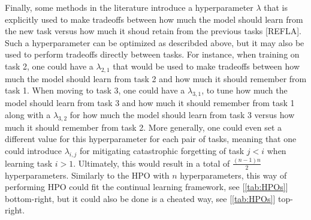 \documentclass[11pt]{article}
\begin{document}
\vspace{2mm}
\noindent
Finally, some methods in the literature introduce a hyperparameter $\lambda$ that is explicitly used to make tradeoffs between how much the model should learn from the new task versus how much it shoud retain from the previous tasks [REFLA]. Such a hyperparameter can be optimized as describded above, but it may also be used to perform tradeoffs directly between tasks. For instance, when training on task 2, one could have a $\lambda_{2,1}$ that would be used to make tradeoffs between how much the model should learn from task 2 and how much it should remember from task 1. When moving to task 3, one could have a $\lambda_{3,1}$, to tune how much the model should learn from task 3 and how much it should remember from task 1 along with a $\lambda_{3,2}$ for how much the model should learn from task 3 versus how much it should remember from task 2. More generally, one could even set a different value for this hyperparameter for each pair of tasks, meaning that one could introduce $\lambda_{i,j}$ for mitigating catastrophic forgetting of task $j<i$ when learning task $i>1$. Ultimately, this would result in a total of $\frac{(n-1)n}{2}$ hyperparameters. Similarly to the HPO with $n$ hyperparameters, this way of performing HPO could fit the continual learning framework, see [\ref{tab:HPOs}] bottom-right, but it could also be done is a cheated way, see [\ref{tab:HPOs}] top-right.


\end{document}
